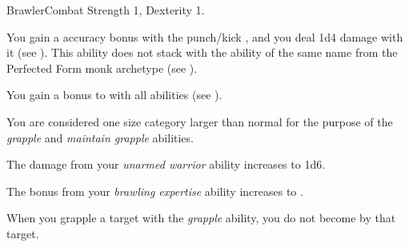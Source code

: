     \begin{feat}{Brawler}{Combat}
        \featpre Strength 1, Dexterity 1.

         You gain a  accuracy bonus with the punch/kick , and you deal 1d4 damage with it (see ).
        This ability does not stack with the ability of the same name from the Perfected Form monk archetype (see ).

         You gain a  bonus to  with all  abilities (see ).

         You are considered one size category larger than normal for the purpose of the \textit{grapple} and \textit{maintain grapple} abilities.

         The damage from your \textit{unarmed warrior} ability increases to 1d6.

         The bonus from your \textit{brawling expertise} ability increases to .

         When you grapple a target with the \textit{grapple} ability, you do not become \grappled by that target.
    \end{feat}

